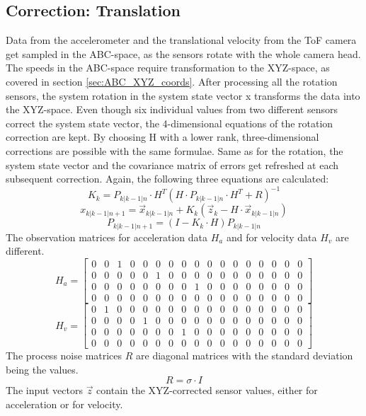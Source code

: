 \subsection{Correction: Translation}
Data from the accelerometer and the translational velocity from the ToF camera get sampled in the ABC-space, as the sensors rotate with the whole camera head. The speeds in the ABC-space require transformation to the XYZ-space, as covered in section \ref{sec:ABC_XYZ_coords}. After processing all the rotation sensors, the system rotation in the system state vector x transforms the data into the XYZ-space. 
Even though six individual values from two different sensors correct the system state vector, the 4-dimensional equations of the rotation correction are kept. By choosing H with a lower rank, three-dimensional corrections are possible with the same formulae. Same as for the rotation, the system state vector and the covariance matrix of errors get refreshed at each subsequent correction.
Again, the following three equations are calculated:
\begin{equation*}
    K_{k} = P_{k|k-1|n}\cdot H^{T}(H\cdot P_{k|k-1|n}\cdot H^{T}+R)^{-1}
\end{equation*}
\begin{equation*}
    x_{k|k-1|n+1} = \vec{x}_{k|k-1|n}+K_{k}(\vec{z}_{k}-H\cdot \vec{x}_{k|k-1|n})
\end{equation*}
\begin{equation*}
    P_{k|k-1|n+1}= (I-K_{k}\cdot H)P_{k|k-1|n}
\end{equation*}
The observation matrices for acceleration data $H_{a}$ and for velocity data $H_{v}$ are different.
\begin{equation*}
    H_{a}=
    \begin{bmatrix}
        0 & 0 & 1 & 0 & 0 & 0 & 0 & 0 & 0 & 0 & 0 & 0 & 0 & 0 & 0 & 0 & 0 \\
        0 & 0 & 0 & 0 & 0 & 1 & 0 & 0 & 0 & 0 & 0 & 0 & 0 & 0 & 0 & 0 & 0 \\
        0 & 0 & 0 & 0 & 0 & 0 & 0 & 0 & 1 & 0 & 0 & 0 & 0 & 0 & 0 & 0 & 0 \\
        0 & 0 & 0 & 0 & 0 & 0 & 0 & 0 & 0 & 0 & 0 & 0 & 0 & 0 & 0 & 0 & 0
    \end{bmatrix}
\end{equation*}
\begin{equation*}
    H_{v}=
    \begin{bmatrix}
        0 & 1 & 0 & 0 & 0 & 0 & 0 & 0 & 0 & 0 & 0 & 0 & 0 & 0 & 0 & 0 & 0 \\
        0 & 0 & 0 & 0 & 1 & 0 & 0 & 0 & 0 & 0 & 0 & 0 & 0 & 0 & 0 & 0 & 0 \\
        0 & 0 & 0 & 0 & 0 & 0 & 0 & 1 & 0 & 0 & 0 & 0 & 0 & 0 & 0 & 0 & 0 \\
        0 & 0 & 0 & 0 & 0 & 0 & 0 & 0 & 0 & 0 & 0 & 0 & 0 & 0 & 0 & 0 & 0
    \end{bmatrix}
\end{equation*}
The process noise matrices $R$ are diagonal matrices with the standard deviation being the values.
\begin{equation*}
R = \sigma \cdot I
\end{equation*}
The input vectors $\vec{z}$ contain the XYZ-corrected sensor values, either for acceleration or for velocity.
